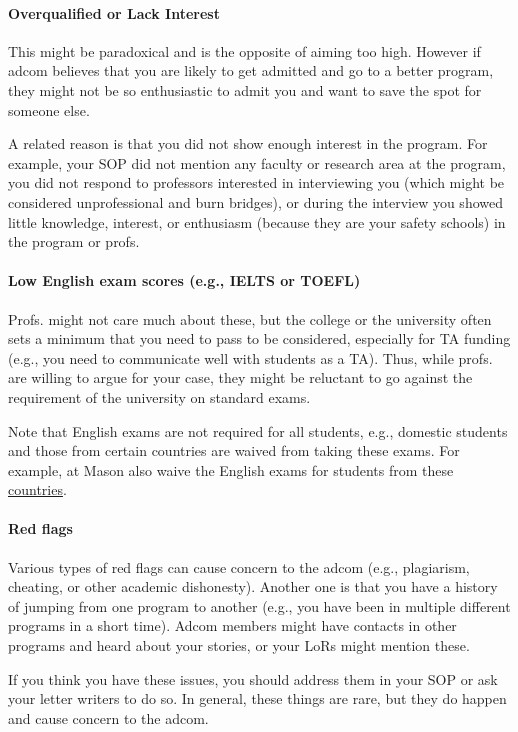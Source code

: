 \documentclass[oneside,11pt,dvipsnames]{book}
\begin{document}
\paragraph{Overqualified or Lack Interest}  This might be paradoxical and is the opposite of aiming too high. However if adcom believes that you are likely to get admitted and go to a better program, they might not be so enthusiastic to admit you and want to save the spot for someone else.

A related reason is that you did not show enough interest in the program.
For example, your SOP did not mention any faculty or research area at the program, you did not respond to professors interested in interviewing you (which might be considered unprofessional and burn bridges), or during the interview you showed little knowledge, interest, or enthusiasm (because they are your safety schools) in the program or profs.


\paragraph{Low English exam scores (e.g., IELTS or TOEFL)}  Profs. might not care much about these, but the college or the university often sets a minimum that you need to pass to be considered, especially for TA funding (e.g., you need to communicate well with students as a TA).  Thus, while profs. are willing to argue for your case, they might be reluctant to go against the requirement of the university on standard exams.  

Note that English exams are not required for all students, e.g., domestic students and those from certain countries are waived from taking these exams.  For example, at Mason also waive the English exams for students from these \href{https://github.com/dynaroars/dynaroars.github.io/wiki/About-Mason#standard-tests-waiver-eligible-countries}{countries}.


\paragraph{Red flags} Various types of red flags can cause concern to the adcom (e.g., plagiarism, cheating, or other academic dishonesty). Another one is that you have a history of jumping from one program to another (e.g., you have been in multiple different programs in a short time). Adcom members might have contacts in other programs and heard about your stories, or your LoRs might mention these.

If you think you have these issues, you should address them in your SOP or ask your letter writers to do so.
In general, these things are rare, but they do happen and cause concern to the adcom.
\end{document}

